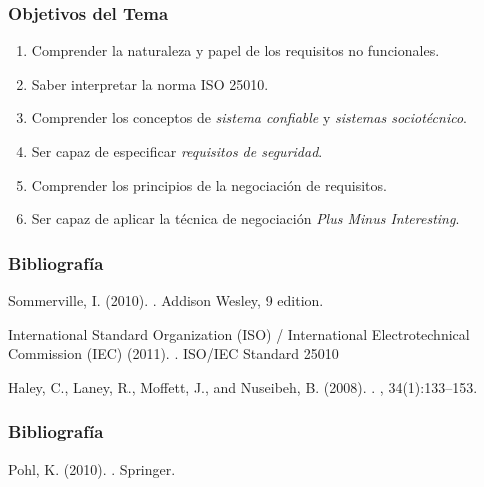 \documentclass[a4paper,slidestop,xcolor=pst,dvips,blue]{beamer}
\begin{document}
\begin{frame}[c]
    \frametitle{Objetivos del Tema}
    \begin{enumerate}[<+->]
         \item Comprender la naturaleza y papel de los requisitos no funcionales.
         \item Saber interpretar la norma ISO 25010.
         \item Comprender los conceptos de \emph{sistema confiable} y \emph{sistemas sociotécnico}.
         \item Ser capaz de especificar \emph{requisitos de seguridad}.
         \item Comprender los principios de la negociación de requisitos.
         \item Ser capaz de aplicar la técnica de negociación \emph{Plus Minus Interesting}.
    \end{enumerate}
\end{frame}

\begin{frame}[c]
    \frametitle{Bibliografía}
    \begin{thebibliography}{}
        Sommerville, I. (2010).
        .
        \newblock Addison Wesley, 9 edition.

        International Standard Organization (ISO) / International Electrotechnical Commission (IEC) (2011).
        . ISO/IEC Standard 25010

        Haley, C., Laney, R., Moffett, J., and Nuseibeh, B. (2008).
        .
        , 34(1):133--153.
    \end{thebibliography}
\end{frame}

\begin{frame}[c]
    \frametitle{Bibliografía}
    \begin{thebibliography}{}

        Pohl, K. (2010).
        .
        \newblock Springer.


    \end{thebibliography}
\end{frame}
\end{document}
